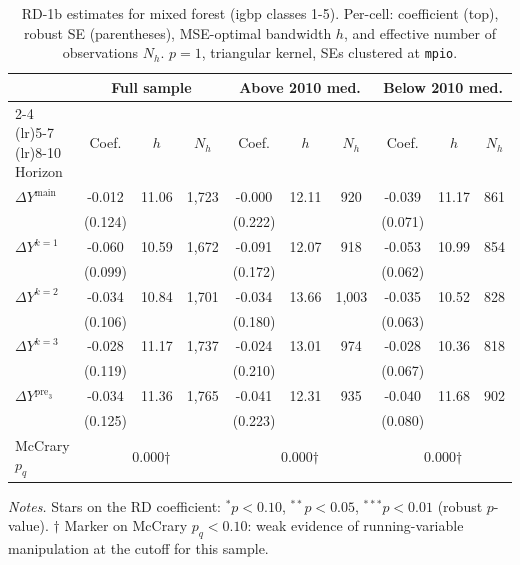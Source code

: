 \documentclass[11pt]{article}
\begin{document}
\begin{table}[H]
\centering
\scriptsize
\caption{RD-1b estimates for mixed forest (igbp classes 1-5). Per-cell: coefficient
(top), robust SE (parentheses), MSE-optimal bandwidth $h$, and
effective number of observations $N_h$. $p=1$, triangular kernel,
SEs clustered at \texttt{mpio}.}
\label{tab:rdplot_rd1b_mixed_forest}
\begin{tabular}{l ccc ccc ccc}
\toprule
 & \multicolumn{3}{c}{Full sample} & \multicolumn{3}{c}{Above 2010 med.} & \multicolumn{3}{c}{Below 2010 med.} \\
\cmidrule(lr){2-4} \cmidrule(lr){5-7} \cmidrule(lr){8-10}
Horizon & Coef. & $h$ & $N_h$ & Coef. & $h$ & $N_h$ & Coef. & $h$ & $N_h$ \\
\midrule
$\Delta Y^{\text{main}}$ & -0.012 & 11.06 & 1,723 & -0.000 & 12.11 & 920 & -0.039 & 11.17 & 861 \\
 & (0.124) &  &  & (0.222) &  &  & (0.071) &  &  \\
\addlinespace[1pt]
$\Delta Y^{k=1}$ & -0.060 & 10.59 & 1,672 & -0.091 & 12.07 & 918 & -0.053 & 10.99 & 854 \\
 & (0.099) &  &  & (0.172) &  &  & (0.062) &  &  \\
\addlinespace[1pt]
$\Delta Y^{k=2}$ & -0.034 & 10.84 & 1,701 & -0.034 & 13.66 & 1,003 & -0.035 & 10.52 & 828 \\
 & (0.106) &  &  & (0.180) &  &  & (0.063) &  &  \\
\addlinespace[1pt]
$\Delta Y^{k=3}$ & -0.028 & 11.17 & 1,737 & -0.024 & 13.01 & 974 & -0.028 & 10.36 & 818 \\
 & (0.119) &  &  & (0.210) &  &  & (0.067) &  &  \\
\addlinespace[1pt]
$\Delta Y^{\text{pre}_3}$ & -0.034 & 11.36 & 1,765 & -0.041 & 12.31 & 935 & -0.040 & 11.68 & 902 \\
 & (0.125) &  &  & (0.223) &  &  & (0.080) &  &  \\
\addlinespace[1pt]
\midrule
McCrary $p_q$ & \multicolumn{3}{c}{0.000$\dagger$} & \multicolumn{3}{c}{0.000$\dagger$} & \multicolumn{3}{c}{0.000$\dagger$} \\
\bottomrule
\end{tabular}
\begin{flushleft}\footnotesize
\textit{Notes.} Stars on the RD coefficient: $^{*}p<0.10$,
$^{**}p<0.05$, $^{***}p<0.01$ (robust $p$-value).
$\dagger$ Marker on McCrary $p_q<0.10$: weak evidence of running-variable manipulation at the cutoff for this sample.\\
\end{flushleft}
\end{table}
\end{document}

